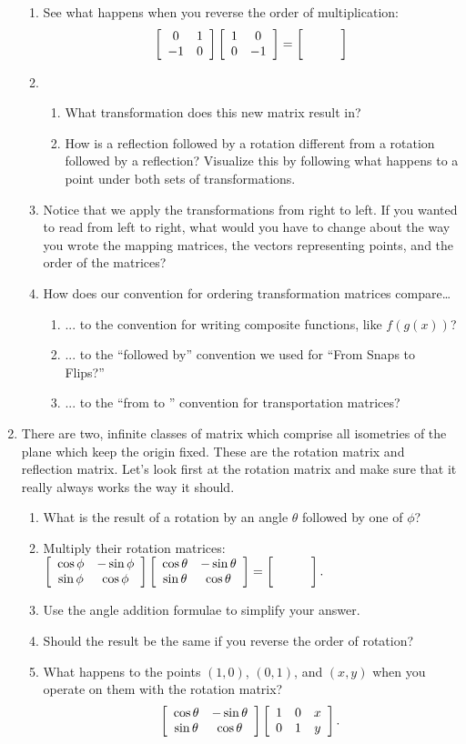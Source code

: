 \documentclass[../gatm.tex]{subfiles}
\begin{document}
\begin{enumerate}
\begin{enumerate}
\item See what happens when you reverse the order of multiplication: \label{prob:cm_fill_in_blank_end}
$$\twomat{0}{1}{-1}{0}\twomat{1}{0}{0}{-1}=\blanktwomat$$
\item \begin{enumerate}
\item What transformation does this new matrix result in?
\item How is a reflection followed by a rotation different from a rotation followed by a reflection? Visualize this by following what happens to a point under both sets of transformations.
\end{enumerate}
\item Notice that we apply the transformations from right to left. If you wanted to read from left to right, what would you have to change about the way you wrote the mapping matrices, the vectors representing points, and the order of the matrices?
\item How does our convention for ordering transformation matrices compare…
\begin{enumerate}
\item ... to the convention for writing composite functions, like $f(g(x))$?
\item ... to the ``followed by'' convention we used for ``From Snaps to Flips?''
\item ... to the ``from \underline{\phantom{0}} to \underline{\phantom{0}}'' convention for transportation matrices?
\end{enumerate}
\end{enumerate}
\item There are two, infinite classes of matrix which comprise all isometries of the plane which keep the origin fixed. These are the rotation matrix and reflection matrix. Let's look first at the rotation matrix and make sure that it really always works the way it should.
\begin{enumerate}
\item What is the result of a rotation by an angle $\theta$ followed by one of $\phi$?
\item Multiply their rotation matrices: $\twomat{\cos \phi}{-\sin \phi}{\sin\phi}{\cos\phi} \twomat{\cos \theta}{-\sin \theta}{\sin\theta}{\cos\theta}=\blanktwomat.$
\item Use the angle addition formulae to simplify your answer.
\item Should the result be the same if you reverse the order of rotation?
\item What happens to the points $(1,0)$, $(0,1)$, and $(x,y)$ when you operate on them with the rotation matrix? $$\left[\begin{array}{cc} \cos \theta & -\sin \theta \\ \sin\theta & \cos\theta \end{array}\right]\left[\begin{array}{ccc} 1 & 0 & x \\ 0 & 1 & y \end{array}\right].$$

\end{enumerate}
\end{enumerate}
\end{document}
